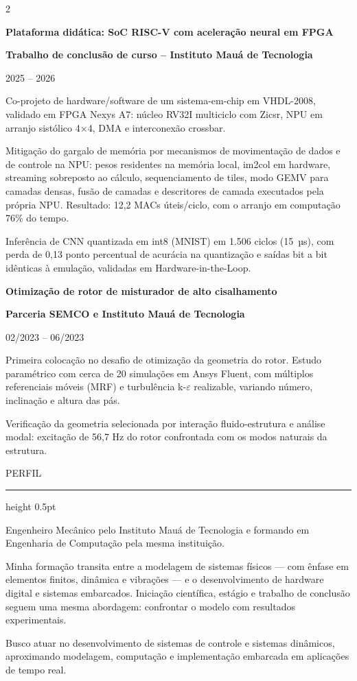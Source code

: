 \documentclass[10pt,a4paper]{article}
\newcommand{\secao}[1]{%
  \Needspace*{6\baselineskip}%
  \vspace{4pt}%
  {\display\fontsize{9.6}{9.6}\selectfont\color{tinta}%
   \addfontfeature{LetterSpace=13}\MakeUppercase{#1}}\par
  \vspace{1.8pt}%
  {\color{filete}\hrule height 0.5pt}%
  \nopagebreak\vspace{6.5pt}%
  \nopagebreak%
}
\newcommand{\cargo}[1]{{\fontsize{9.5}{11.0}\selectfont\bfseries\color{tinta}#1}\par}
\newcommand{\org}[1]{{\fontsize{8.7}{10.0}\selectfont\bfseries\color{meio}#1}\par}
\newcommand{\periodo}[1]{{\fontsize{8.1}{9.4}\selectfont\color{claro}#1}\par\vspace{1pt}}
\newcommand{\bloco}[3]{\par\noindent\begin{minipage}{\linewidth}%
  \cargo{#1}\org{#2}\periodo{#3}\end{minipage}\nopagebreak\vspace{1.5pt}}
\begin{document}
\begin{paracol}{2}
\vspace{7pt}
\bloco{Plataforma didática: SoC RISC-V com aceleração neural em FPGA}{Trabalho de conclusão de curso – Instituto Mauá de Tecnologia}{2025 – 2026}
\begin{itens}
  \item Co-projeto de hardware/software de um sistema-em-chip em VHDL-2008, validado em FPGA Nexys A7: núcleo RV32I multiciclo com Zicsr, NPU em arranjo sistólico 4×4, DMA e interconexão crossbar.
  \item Mitigação do gargalo de memória por mecanismos de movimentação de dados e de controle na NPU: pesos residentes na memória local, im2col em hardware, streaming sobreposto ao cálculo, sequenciamento de tiles, modo GEMV para camadas densas, fusão de camadas e descritores de camada executados pela própria NPU. Resultado: 12,2 MACs úteis/ciclo, com o arranjo em computação 76\% do tempo.
  \item Inferência de CNN quantizada em int8 (MNIST) em 1.506 ciclos (15~µs), com perda de 0,13 ponto percentual de acurácia na quantização e saídas bit a bit idênticas à emulação, validadas em Hardware-in-the-Loop.
\end{itens}

\vspace{7pt}
\bloco{Otimização de rotor de misturador de alto cisalhamento}{Parceria SEMCO e Instituto Mauá de Tecnologia}{02/2023 – 06/2023}
\begin{itens}
  \item Primeira colocação no desafio de otimização da geometria do rotor. Estudo paramétrico com cerca de 20 simulações em Ansys Fluent, com múltiplos referenciais móveis (MRF) e turbulência k-$\varepsilon$ realizable, variando número, inclinação e altura das pás.
  \item Verificação da geometria selecionada por interação fluido-estrutura e análise modal: excitação de 56,7 Hz do rotor confrontada com os modos naturais da estrutura.
\end{itens}

\switchcolumn

\secao{Perfil}
{\fontsize{8.5}{11.0}\selectfont\color{corpo}
Engenheiro Mecânico pelo Instituto Mauá de Tecnologia e formando em Engenharia de Computação pela mesma instituição.\par
\vspace{4pt}
Minha formação transita entre a modelagem de sistemas físicos — com ênfase em elementos finitos, dinâmica e vibrações — e o desenvolvimento de hardware digital e sistemas embarcados. Iniciação científica, estágio e trabalho de conclusão seguem uma mesma abordagem: confrontar o modelo com resultados experimentais.\par
\vspace{4pt}
Busco atuar no desenvolvimento de sistemas de controle e sistemas dinâmicos, aproximando modelagem, computação e implementação embarcada em aplicações de tempo real.\par}


\end{paracol}
\end{document}
